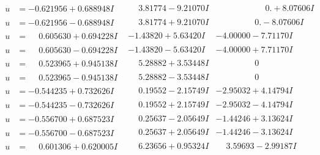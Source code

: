 \documentclass[1p]{elsarticle_modified}
\theoremstyle{definition}
\begin{document}
$$\begin{array}{c|c|c}
\begin{aligned}
u &= -0.621956 + 0.688948 I\end{aligned}
 & \phantom{-}3.81774 - 9.21070 I & \phantom{-0.000000 -}0. + 8.07606 I \\ \hline\begin{aligned}
u &= -0.621956 - 0.688948 I\end{aligned}
 & \phantom{-}3.81774 + 9.21070 I & \phantom{-0.000000 } 0. - 8.07606 I \\ \hline\begin{aligned}
u &= \phantom{-}0.605630 + 0.694228 I\end{aligned}
 & -1.43820 + 5.63420 I & -4.00000 - 7.71170 I \\ \hline\begin{aligned}
u &= \phantom{-}0.605630 - 0.694228 I\end{aligned}
 & -1.43820 - 5.63420 I & -4.00000 + 7.71170 I \\ \hline\begin{aligned}
u &= \phantom{-}0.523965 + 0.945138 I\end{aligned}
 & \phantom{-}5.28882 + 3.53448 I & \phantom{-0.000000 } 0 \\ \hline\begin{aligned}
u &= \phantom{-}0.523965 - 0.945138 I\end{aligned}
 & \phantom{-}5.28882 - 3.53448 I & \phantom{-0.000000 } 0 \\ \hline\begin{aligned}
u &= -0.544235 + 0.732626 I\end{aligned}
 & \phantom{-}0.19552 - 2.15749 I & -2.95032 + 4.14794 I \\ \hline\begin{aligned}
u &= -0.544235 - 0.732626 I\end{aligned}
 & \phantom{-}0.19552 + 2.15749 I & -2.95032 - 4.14794 I \\ \hline\begin{aligned}
u &= -0.556700 + 0.687523 I\end{aligned}
 & \phantom{-}0.25637 - 2.05649 I & -1.44246 + 3.13624 I \\ \hline\begin{aligned}
u &= -0.556700 - 0.687523 I\end{aligned}
 & \phantom{-}0.25637 + 2.05649 I & -1.44246 - 3.13624 I \\ \hline\begin{aligned}
u &= \phantom{-}0.601306 + 0.620005 I\end{aligned}
 & \phantom{-}6.23656 + 0.95324 I & \phantom{-}3.59693 - 2.99187 I \\ \hline\begin{aligned}

\end{aligned}
\end{array}$$
\end{document}
